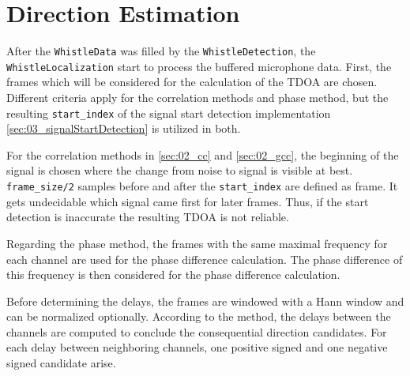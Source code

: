 \section{Direction Estimation}
\label{sec:03_direction}

After the \lstinline!WhistleData! was filled by the \lstinline!WhistleDetection!,
the \lstinline!WhistleLocalization! start to process the buffered microphone data.
First, the frames which will be considered for the calculation of the \ac{TDOA}
are chosen.
Different criteria apply for the correlation methods and phase method, but the
resulting \lstinline!start_index! of the signal start detection implementation
\cref{sec:03_signalStartDetection} is utilized in both.

For the correlation methods in \cref{sec:02_cc} and \cref{sec:02_gcc}, the beginning
of the signal is chosen where the change from noise to signal is visible at best.
\lstinline!frame_size/2! samples before and after the \lstinline!start_index! are defined
as frame.
It gets undecidable which signal came first for later frames. Thus, if the start detection
is inaccurate the resulting \ac{TDOA} is not reliable.

Regarding the phase method,
the frames with the same maximal frequency for each channel are used for the
phase difference calculation.
The phase difference of this frequency is then considered for the phase difference
calculation. %

Before determining the delays, the frames are windowed with a Hann window and can be
normalized optionally.
According to the method, the delays between the channels are computed to conclude the
consequential direction candidates.
For each delay between neighboring channels, one positive signed and one negative
signed candidate arise.

